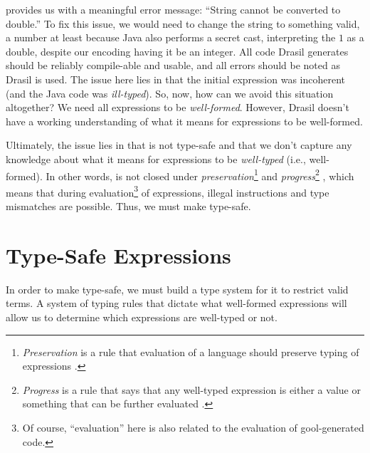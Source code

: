 \pseudoExampleLandPosQDBadTypingJavaCode{}

\pseudoExampleLandPosQDBadTypingJavaCodeCompErr{}

 provides us with a
meaningful error message: ``String cannot be converted to double.'' To fix this
issue, we would need to change the string to something valid, a number at least
because Java also performs a secret cast, interpreting the \(1\) as a double,
despite our encoding having it be an integer. All code Drasil generates should
be reliably compile-able and usable, and all errors should be noted as Drasil is
used. The issue here lies in that the initial expression was incoherent (and the
Java code was \textit{ill-typed}). So, now, how can we avoid this situation
altogether? We need all expressions to be \textit{well-formed}. However, Drasil
doesn't have a working understanding of what it means for expressions to be
well-formed.

Ultimately, the issue lies in that \Expr{} is not type-safe \cite{Harper2016}
and that we don't capture any knowledge about what it means for expressions to
be \textit{well-typed} (i.e., well-formed). In other words, \Expr{} is not
closed under \textit{preservation}\footnote{\textit{Preservation} is a rule that
evaluation of a language should preserve typing of expressions
\cite{Harper2016}.} and \textit{progress}\footnote{\textit{Progress} is a rule
that says that any well-typed expression is either a value or something that can
be further evaluated \cite{Harper2016}.} \cite{Harper2016}, which means that
during evaluation\footnote{Of course, ``evaluation'' here is also related to the
evaluation of \acs{gool}-generated code.} of expressions, illegal instructions
and type mismatches are possible. Thus, we must make \Expr{} type-safe.

\section{Type-Safe Expressions}
\label{chap:typed-expr:sec:type-safe-expressions}

In order to make \Expr{} type-safe, we must build a type system for it to
restrict valid \Expr{} terms. A system of typing rules that dictate what
well-formed expressions will allow us to determine which expressions are
well-typed or not.


